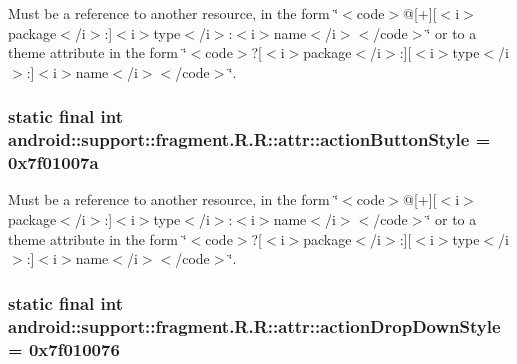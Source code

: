 Must be a reference to another resource, in the form \char`\"{}$<$code$>$@\mbox{[}+\mbox{]}\mbox{[}$<$i$>$package$<$/i$>$:\mbox{]}$<$i$>$type$<$/i$>$:$<$i$>$name$<$/i$>$$<$/code$>$\char`\"{} or to a theme attribute in the form \char`\"{}$<$code$>$?\mbox{[}$<$i$>$package$<$/i$>$:\mbox{]}\mbox{[}$<$i$>$type$<$/i$>$:\mbox{]}$<$i$>$name$<$/i$>$$<$/code$>$\char`\"{}. \hypertarget{classandroid_1_1support_1_1fragment_1_1_r_1_1attr_14116a49b9e97347c03d5a6d64069136}{
\subsubsection[{actionButtonStyle}]{\setlength{\rightskip}{0pt plus 5cm}static final int android::support::fragment.R.R::attr::actionButtonStyle = 0x7f01007a}}
\label{classandroid_1_1support_1_1fragment_1_1_r_1_1attr_14116a49b9e97347c03d5a6d64069136}


Must be a reference to another resource, in the form \char`\"{}$<$code$>$@\mbox{[}+\mbox{]}\mbox{[}$<$i$>$package$<$/i$>$:\mbox{]}$<$i$>$type$<$/i$>$:$<$i$>$name$<$/i$>$$<$/code$>$\char`\"{} or to a theme attribute in the form \char`\"{}$<$code$>$?\mbox{[}$<$i$>$package$<$/i$>$:\mbox{]}\mbox{[}$<$i$>$type$<$/i$>$:\mbox{]}$<$i$>$name$<$/i$>$$<$/code$>$\char`\"{}. \hypertarget{classandroid_1_1support_1_1fragment_1_1_r_1_1attr_042dbfb01f3ef4722dbb0cf371cf444d}{
\subsubsection[{actionDropDownStyle}]{\setlength{\rightskip}{0pt plus 5cm}static final int android::support::fragment.R.R::attr::actionDropDownStyle = 0x7f010076}}
\label{classandroid_1_1support_1_1fragment_1_1_r_1_1attr_042dbfb01f3ef4722dbb0cf371cf444d}


